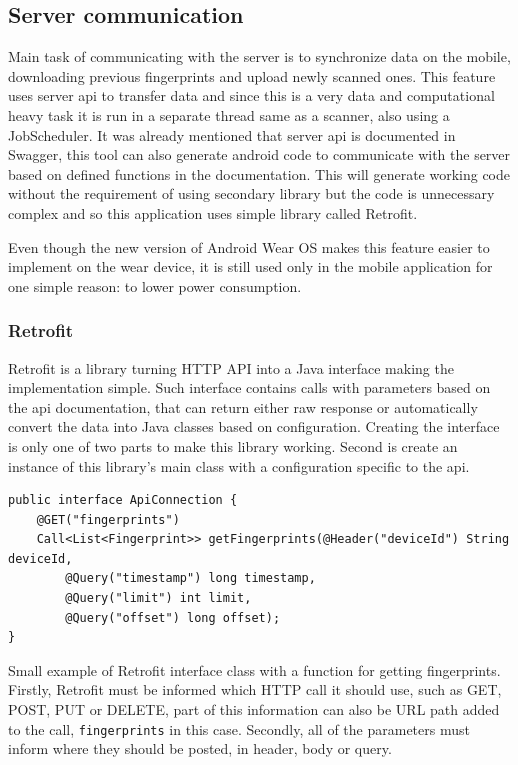 \subsection{Server communication}\label{subsec:ServerCommunication}
Main task of communicating with the server is to synchronize data on the mobile, downloading previous fingerprints and upload newly scanned ones. This feature uses server api to transfer data and since this is a very data and computational heavy task it is run in a separate thread same as a scanner, also using a JobScheduler. It was already mentioned that server api is documented in Swagger, this tool can also generate android code to communicate with the server based on defined functions in the documentation. This will generate working code without the requirement of using secondary library but the code is unnecessary complex and so this application uses simple library called Retrofit.

Even though the new version of Android Wear OS makes this feature easier to implement on the wear device, it is still used only in the mobile application for one simple reason: to lower power consumption. 

\subsubsection{Retrofit}\label{subsec:Retrofit}
Retrofit is a library turning HTTP API into a Java interface making the implementation simple. Such interface contains calls with parameters based on the api documentation, that can return either raw response or automatically convert the data into Java classes based on configuration. Creating the interface is only one of two parts to make this library working. Second is create an instance of this library's main class with a configuration specific to the api.

\begin{lstlisting}[caption=Retrofit interface example.]
public interface ApiConnection {
	@GET("fingerprints")
	Call<List<Fingerprint>> getFingerprints(@Header("deviceId") String deviceId,
		@Query("timestamp") long timestamp,
		@Query("limit") int limit,
		@Query("offset") long offset);
}
\end{lstlisting}

Small example of Retrofit interface class with a function for getting fingerprints. Firstly, Retrofit must be informed which HTTP call it should use, such as GET, POST, PUT or DELETE, part of this information can also be URL path added to the call, \verb|fingerprints| in this case. Secondly, all of the parameters must inform 
where they should be posted, in header, body or query.

